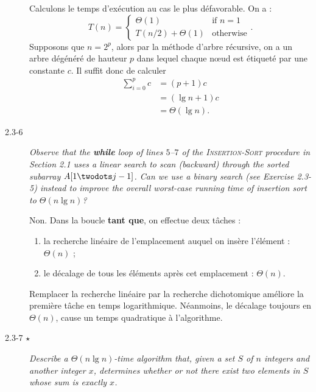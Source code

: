\begin{description}
\begin{ex}
    Calculons le temps d'ex\'ecution au cas le plus d\'efavorable. On a :
    $$T(n) = \left\{ 
      \begin{array}{ll}
        \Theta(1) & \text{if } n = 1\\
        T(n/2) + \Theta(1) & \text{otherwise}
      \end{array}
    \right..$$
    Supposons que $n = 2^p$, alors par la m\'ethode d'arbre r\'ecursive, on a un arbre d\'eg\'en\'er\'e de hauteur $p$ dans lequel chaque n\oe ud est \'etiquet\'e par une constante $c$. Il suffit donc de calculer 
    \begin{align*}
      \sum_{i=0}^{p}c &= (p+1)c\\
     &= (\lg n + 1)c\\
     &= \Theta(\lg n).
    \end{align*}
  \end{ex}

\item[2.3-6] {\itshape Observe that the {\bfseries while} loop of lines $5$–$7$ of the {\scshape Insertion-Sort} procedure in Section 2.1 uses a linear search to scan (backward) through the sorted subarray $A[1 \twodots j-1]$. Can we use a binary search (see Exercise 2.3-5) instead to improve the overall worst-case running time of insertion sort to $\Theta(n \lg n)$?}

  \begin{ex}
    Non. Dans la boucle \textbf{tant que}, on effectue deux t\^aches :
    \begin{enumerate}
      \item la recherche lin\'eaire de l'emplacement auquel on ins\`ere l'\'el\'ement : $\Theta (n)$ ;
      \item le d\'ecalage de tous les \'el\'ements apr\`es cet emplacement : $\Theta (n)$.
    \end{enumerate}
    Remplacer la recherche lin\'eaire par la recherche dichotomique am\'eliore la premi\`ere t\^ache en temps logarithmique. N\'eanmoins, le d\'ecalage toujours en $\Theta(n)$, cause un temps quadratique \`a l'algorithme.
  \end{ex}

\item[2.3-7 $\star$] {\itshape Describe a $\Theta (n \lg n)$-time algorithm that, given a set $S$ of $n$ integers and another integer $x$, determines whether or not there exist two elements in $S$ whose sum is exactly $x$.}

  \begin{exrev}
    
  \end{exrev}

\end{description}

